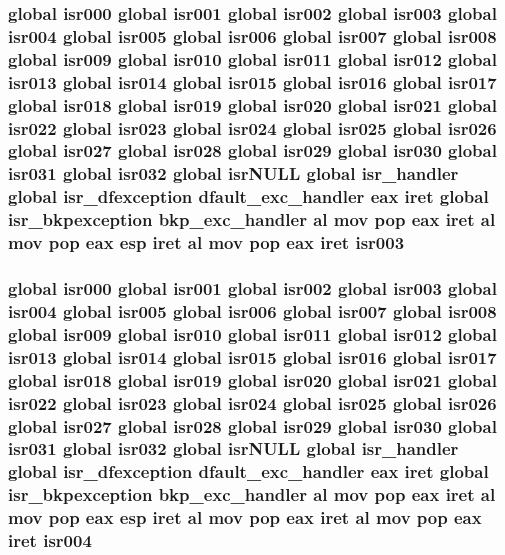 \subsubsection[{\texorpdfstring{isr003}{isr003}}]{\setlength{\rightskip}{0pt plus 5cm}global {\bf isr000} global {\bf isr001} global {\bf isr002} global isr003 global {\bf isr004} global {\bf isr005} global {\bf isr006} global {\bf isr007} global {\bf isr008} global {\bf isr009} global {\bf isr010} global {\bf isr011} global {\bf isr012} global {\bf isr013} global {\bf isr014} global {\bf isr015} global {\bf isr016} global {\bf isr017} global {\bf isr018} global {\bf isr019} global {\bf isr020} global {\bf isr021} global {\bf isr022} global {\bf isr023} global {\bf isr024} global {\bf isr025} global {\bf isr026} global {\bf isr027} global {\bf isr028} global {\bf isr029} global {\bf isr030} global {\bf isr031} global isr032 global isr\+N\+U\+LL global isr\+\_\+handler global {\bf isr\+\_\+dfexception} {\bf dfault\+\_\+exc\+\_\+handler} eax iret global {\bf isr\+\_\+bkpexception} {\bf bkp\+\_\+exc\+\_\+handler} {\bf al} {\bf mov} pop eax iret {\bf al} {\bf mov} pop eax esp iret {\bf al} {\bf mov} pop eax iret isr003}\hypertarget{isrs_8as_a86095b2d2b61d2b11119fbb6fd0b6089}{}\label{isrs_8as_a86095b2d2b61d2b11119fbb6fd0b6089}
\subsubsection[{\texorpdfstring{isr004}{isr004}}]{\setlength{\rightskip}{0pt plus 5cm}global {\bf isr000} global {\bf isr001} global {\bf isr002} global {\bf isr003} global isr004 global {\bf isr005} global {\bf isr006} global {\bf isr007} global {\bf isr008} global {\bf isr009} global {\bf isr010} global {\bf isr011} global {\bf isr012} global {\bf isr013} global {\bf isr014} global {\bf isr015} global {\bf isr016} global {\bf isr017} global {\bf isr018} global {\bf isr019} global {\bf isr020} global {\bf isr021} global {\bf isr022} global {\bf isr023} global {\bf isr024} global {\bf isr025} global {\bf isr026} global {\bf isr027} global {\bf isr028} global {\bf isr029} global {\bf isr030} global {\bf isr031} global isr032 global isr\+N\+U\+LL global isr\+\_\+handler global {\bf isr\+\_\+dfexception} {\bf dfault\+\_\+exc\+\_\+handler} eax iret global {\bf isr\+\_\+bkpexception} {\bf bkp\+\_\+exc\+\_\+handler} {\bf al} {\bf mov} pop eax iret {\bf al} {\bf mov} pop eax esp iret {\bf al} {\bf mov} pop eax iret {\bf al} {\bf mov} pop eax iret isr004}\hypertarget{isrs_8as_a562ffddc7a8577ee55787d991e64e51c}{}\label{isrs_8as_a562ffddc7a8577ee55787d991e64e51c}
